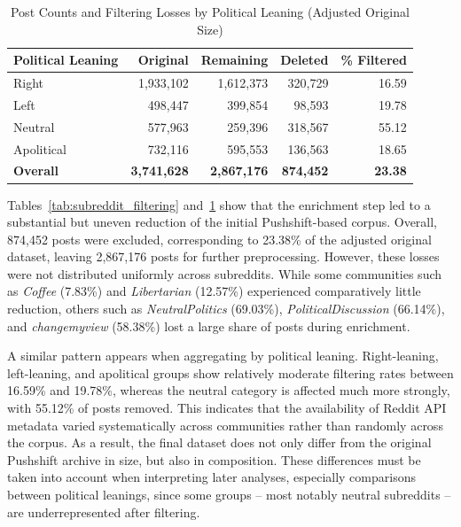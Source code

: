 \begin{table}[htbp]
\centering
\small
\caption{Post Counts and Filtering Losses by Political Leaning (Adjusted Original Size)}
\label{tab:leaning_filtering}
\begin{tabular}{lrrrr}
\hline
\textbf{Political Leaning} & \textbf{Original} & \textbf{Remaining} & \textbf{Deleted} & \textbf{\% Filtered} \\
\hline
Right        & 1{,}933{,}102 & 1{,}612{,}373 & 320{,}729 & 16.59 \\
Left         &   498{,}447 &   399{,}854 &  98{,}593 & 19.78 \\
Neutral      &   577{,}963 &   259{,}396 & 318{,}567 & 55.12 \\
Apolitical  &   732{,}116 &   595{,}553 & 136{,}563 & 18.65 \\
\hline
\textbf{Overall} & \textbf{3{,}741{,}628} & \textbf{2{,}867{,}176} & \textbf{874{,}452} & \textbf{23.38} \\
\hline
\end{tabular}
\end{table}

Tables~\ref{tab:subreddit_filtering} and~\ref{tab:leaning_filtering} show that the enrichment step led to a substantial but uneven reduction of the initial Pushshift-based corpus. Overall, 874{,}452 posts were excluded, corresponding to 23.38\% of the adjusted original dataset, leaving 2{,}867{,}176 posts for further preprocessing. However, these losses were not distributed uniformly across subreddits. While some communities such as \textit{Coffee} (7.83\%) and \textit{Libertarian} (12.57\%) experienced comparatively little reduction, others such as \textit{NeutralPolitics} (69.03\%), \textit{PoliticalDiscussion} (66.14\%), and \textit{changemyview} (58.38\%) lost a large share of posts during enrichment.

A similar pattern appears when aggregating by political leaning. Right-leaning, left-leaning, and apolitical groups show relatively moderate filtering rates between 16.59\% and 19.78\%, whereas the neutral category is affected much more strongly, with 55.12\% of posts removed. This indicates that the availability of Reddit API metadata varied systematically across communities rather than randomly across the corpus. As a result, the final dataset does not only differ from the original Pushshift archive in size, but also in composition. These differences must be taken into account when interpreting later analyses, especially comparisons between political leanings, since some groups -- most notably neutral subreddits -- are underrepresented after filtering.

